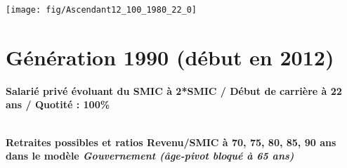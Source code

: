 \vspace{0.1cm} 

 {\hspace{-2.2cm}\texttt{[image: fig/Ascendant12\_100\_1980\_22\_0]}} 

\newpage 
 
\section{Génération 1990 (début en 2012)\label{Ascendant12_100_1990_22_0}} 
 
{\bf \noindent Salarié privé évoluant du SMIC à 2*SMIC / Début de carrière à 22 ans / Quotité : 100\%}  ~ 

 ~\\{\bf \noindent Retraites possibles et ratios Revenu/SMIC à 70, 75, 80, 85, 90 ans dans le modèle \emph{Gouvernement (âge-pivot bloqué à 65 ans)}}  
 
